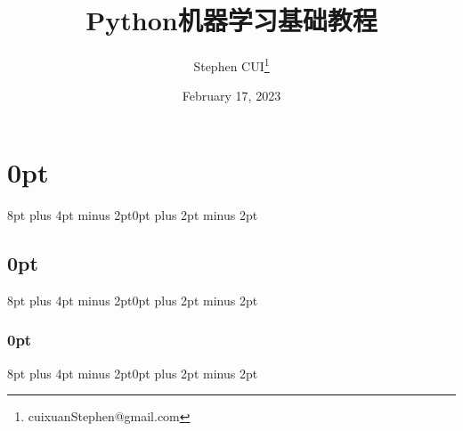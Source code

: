\usepackage{amsmath, amssymb}
\usepackage{mathptmx}
\usepackage{siunitx}
\usepackage{ctex}
\usepackage{minted}
\usepackage{tcolorbox}
\usepackage{epigraph}
\usepackage{caption}
\usepackage{subcaption}
\usepackage{pdfpages}
\usepackage{graphicx}
\usepackage{listings}
\newtheorem{theorem}{Theorem}
\usepackage{tikz}
\usepackage{pifont}
\usepackage{tabularx}
\usepackage{framed}
\usepackage[lined,boxed,ruled]{algorithm2e}
\usepackage{titlesec}
\usepackage{bm}

\titlespacing\section{0pt}{8pt plus 4pt minus 2pt}{0pt plus 2pt minus 2pt}
\titlespacing\subsection{0pt}{8pt plus 4pt minus 2pt}{0pt plus 2pt minus 2pt}
\titlespacing\subsubsection{0pt}{8pt plus 4pt minus 2pt}{0pt plus 2pt minus 2pt}

\makeatletter
\let\old@endpart\@endpart
\renewcommand\@endpart[1][]{%
    \begin{quote}#1\end{quote}%
    \old@endpart}
\makeatother


\title{\textbf{Python机器学习基础教程}}

\author{Stephen CUI\thanks{cuixuanStephen@gmail.com}}
\date{February 17, 2023}

\newcommand\tips[1]{\textcolor{green!70!black}{#1}}
\newcommand\notes[1]{\textcolor{blue!70}{#1}}
\newcommand\important[1]{\textcolor{red!90!black}{#1}}

\newcommand\figures[1]{
    \begin{figure}
        \centering
        \texttt{[image: ../Codes/Figures/\#1.png]}
        \caption{#1}
        \label{#1}
    \end{figure}
}

\usepackage{enumitem}

